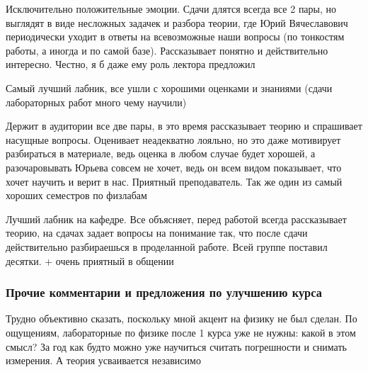                 \begin{commentbox} 
                    Исключительно положительные эмоции. Сдачи длятся всегда все 2 пары, но выглядят в виде несложных задачек и разбора теории, где Юрий Вячеславович периодически уходит в ответы на всевозможные наши вопросы (по тонкостям работы, а иногда и по самой базе). Рассказывает понятно и действительно интересно. Честно, я б даже ему роль лектора предложил 
                \end{commentbox} 
            
                \begin{commentbox} 
                    Самый лучший лабник, все ушли с хорошими оценками и знаниями (сдачи лабораторных работ много чему научили) 
                \end{commentbox} 
            
                \begin{commentbox} 
                    Держит в аудитории все две пары, в это время рассказывает теорию и спрашивает насущные вопросы. Оценивает неадекватно лояльно, но это даже мотивирует разбираться в материале, ведь оценка в любом случае будет хорошей, а разочаровывать Юрьева совсем не хочет, ведь он всем видом показывает, что хочет научить и верит в нас. Приятный преподаватель. Так же один из самый хороших семестров по физлабам  
                \end{commentbox} 
            
                \begin{commentbox} 
                    Лучший лабник на кафедре. Все объясняет, перед работой всегда рассказывает теорию, на сдачах задает вопросы на понимание так, что после сдачи действительно разбираешься в проделанной работе. Всей группе поставил десятки. + очень приятный в общении 
                \end{commentbox} 

        
        \subsubsection{Прочие комментарии и предложения по улучшению курса}
            \begin{commentbox}
                Трудно объективно сказать, поскольку мной акцент на физику не был сделан. По ощущениям, лабораторные по физике после 1 курса уже не нужны: какой в этом смысл? За год как будто можно уже научиться считать погрешности и снимать измерения. А теория усваивается независимо
            \end{commentbox}


